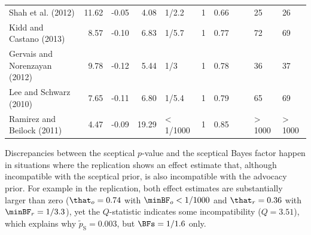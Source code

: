 \begin{landscape}
\begin{table}[!htb]
{\begin{tabular}{lrrrlllllll}
  Shah et al. (2012) & 11.62 & -0.05 & 4.08 & 1/2.2 & 1 & 0.66 &  &  & 25 & 26 \\
  Kidd and Castano (2013) & 8.57 & -0.10 & 6.83 & 1/5.7 & 1 & 0.77 &  &  & 72 & 69 \\
  Gervais and Norenzayan (2012) & 9.78 & -0.12 & 5.44 & 1/3 & 1 & 0.78 &  &  & 36 & 37 \\
  Lee and Schwarz (2010) & 7.65 & -0.11 & 6.80 & 1/5.4 & 1 & 0.79 &  &  & 65 & 69 \\
  Ramirez and Beilock (2011) & 4.47 & -0.09 & 19.29 & < 1/1000 & 1 & 0.85 &  &  & > 1000 & > 1000 \\
   \bottomrule
\end{tabular}
}
\label{tab:ssrp}
\end{table}

\end{landscape}



Discrepancies between the sceptical $p$-value and the sceptical Bayes factor
happen in situations where the replication shows an effect estimate that,
although incompatible with the sceptical prior, is also incompatible with the
advocacy prior. For example in the \citet{Janssen2010} replication, both effect
estimates are substantially larger than zero ($\that_o = 0.74$ with
\mbox{$\minBF_{o} < 1/1000$} and $\that_r = 0.36$ with $\minBF_{r} = 1/3.3$),
yet the $Q$-statistic indicates some incompatibility ($Q = 3.51$), which
explains why $\tilde{p}_{\mathrm{S}} = 0.003$, but $\BFs = 1/1.6$ only.

